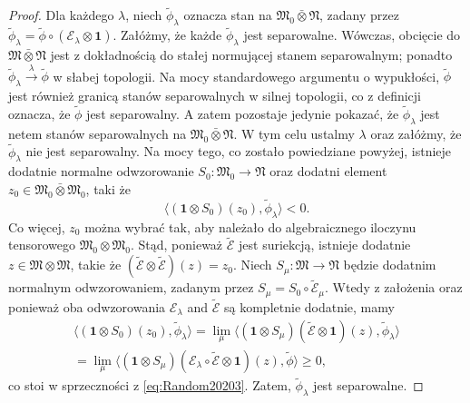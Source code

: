 \begin{proof}
Dla każdego $\lambda$, niech $\tilde{\phi}_{\lambda}$ oznacza stan na
$\mathfrak{M}_{0} \bar{\otimes} \mathfrak{N}$, zadany przez
$\tilde{\phi}_{\lambda} = \tilde{\phi} \circ(\mathcal{E}_{\lambda}
\otimes \mathbf{1})$.
Załóżmy, że każde $\tilde{\phi}_{\lambda}$ jest separowalne.
Wówczas, obcięcie do $\mathfrak{M} \bar{\otimes} \mathfrak{N}$ jest
z dokładnością do stałej normującej stanem separowalnym; ponadto
$\tilde{\phi}_{\lambda} \stackrel{\lambda}{\rightarrow}
\tilde{\phi}$ w słabej topologii.
Na mocy standardowego argumentu o wypukłości,
$\tilde{\phi}$ jest również granicą stanów separowalnych w silnej topologii,
co z definicji oznacza, że $\tilde{\phi}$ jest separowalny.
A zatem pozostaje jedynie pokazać, że  $\tilde{\phi}_{\lambda}$
jest netem stanów separowalnych na $\mathfrak{M}_{0} \bar{\otimes} \mathfrak{N}$.
W tym celu ustalmy $\lambda$ oraz załóżmy, że $\tilde{\phi}_{\lambda}$
nie jest separowalny.
Na mocy tego, co zostało powiedziane powyżej,
istnieje dodatnie normalne odwzorowanie
$S_{0}: \mathfrak{M}_{0} \rightarrow \mathfrak{N}$
oraz dodatni element
$z_{0} \in \mathfrak{M}_{0} \bar{\otimes} \mathfrak{M}_{0}$,
taki że
\begin{equation}
\label{eq:Random20203}
\langle(\mathbf{1} \otimes S_{0})(z_{0}),\tilde{\phi}_{\lambda}\rangle < 0.
\end{equation}
Co więcej, $z_{0}$ można wybrać tak, aby należało do algebraicznego
iloczynu tensorowego $\mathfrak{M}_{0} \otimes \mathfrak{M}_{0}$.
Stąd, ponieważ $\tilde{\mathcal{E}}$ jest suriekcją,
istnieje dodatnie
$z \in \mathfrak{M} \otimes \mathfrak{M}$, takie że
$(\tilde{\mathcal{E}} \otimes \tilde{\mathcal{E}})(z) = z_{0}$.
Niech $S_{\mu}: \mathfrak{M} \rightarrow \mathfrak{N}$
będzie dodatnim normalnym odwzorowaniem, zadanym przez
$S_{\mu} = S_{0} \circ \tilde{\mathcal{E}}_{\mu}$.
Wtedy z założenia oraz ponieważ oba odwzorowania
$\mathcal{E}_{\lambda}$ and $\tilde{\mathcal{E}}$
są kompletnie dodatnie, mamy
\begin{eqnarray}
\langle(\mathbf{1} \otimes S_{0})(z_{0}),\tilde{\phi}_{\lambda} \rangle =
\lim \limits_{\mu} \langle(\mathbf{1} \otimes S_{\mu})(\tilde{\mathcal{E}}
\otimes \mathbf{1})(z) ,\tilde{\phi}_{\lambda}\rangle \nonumber \\
= \lim \limits_{\mu} \langle
(\mathbf{1} \otimes S_{\mu})(\mathcal{E}_{\lambda}\circ
\tilde{\mathcal{E}}\otimes \mathbf{1})(z) ,\tilde{\phi}\rangle \geq 0,
\end{eqnarray}
co stoi w sprzeczności z \eqref{eq:Random20203}.
Zatem, $\tilde{\phi}_{\lambda}$
jest separowalne.
\end{proof}

